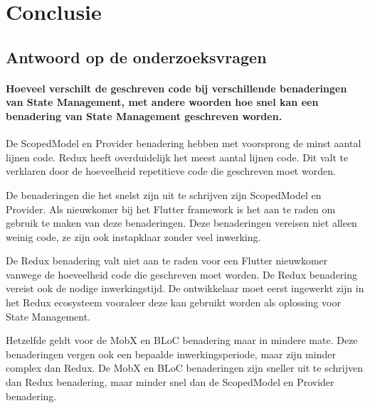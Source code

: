 
\chapter{Conclusie}
\label{ch:conclusie}


\section{Antwoord op de onderzoeksvragen}
\subsubsection{Hoeveel verschilt de geschreven code bij verschillende benaderingen van State Management, met andere woorden hoe snel kan een benadering van State Management geschreven worden.}
De ScopedModel en Provider benadering hebben met voorsprong de minst aantal lijnen code. Redux heeft overduidelijk het meest aantal lijnen code. Dit valt te verklaren door de hoeveelheid repetitieve code die geschreven moet worden. 

De benaderingen die het snelst zijn uit te schrijven zijn ScopedModel en Provider. Als nieuwkomer bij het Flutter framework is het aan te raden om gebruik te maken van deze benaderingen. Deze benaderingen vereisen niet alleen weinig code, ze zijn ook instapklaar zonder veel inwerking.  

De Redux benadering valt niet aan te raden voor een Flutter nieuwkomer vanwege de hoeveelheid code die geschreven moet worden. De Redux benadering vereist ook de nodige inwerkingstijd. De ontwikkelaar moet eerst ingewerkt zijn in het Redux ecosysteem vooraleer deze kan gebruikt worden als oplossing voor State Management. 

Hetzelfde geldt voor de MobX en BLoC benadering maar in mindere mate. Deze benaderingen vergen ook een bepaalde inwerkingsperiode, maar zijn minder complex dan Redux. De MobX en BLoC benaderingen zijn sneller uit te schrijven dan Redux benadering, maar minder snel dan de ScopedModel en Provider benadering.

